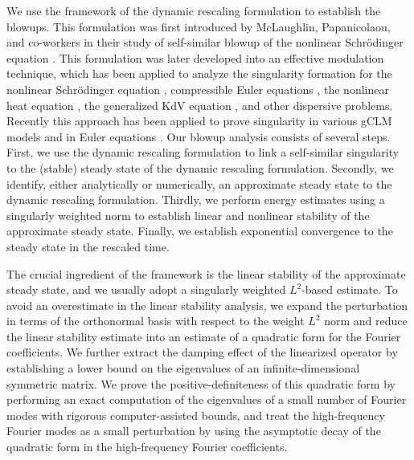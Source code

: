 \documentclass[12pt]{caltech_thesis}
\numberwithin{equation}{section}
\begin{document}
We use the framework of the dynamic rescaling formulation to establish the blowups. This formulation was first introduced by McLaughlin, Papanicolaou, and co-workers in their study of self-similar blowup of the nonlinear Schr\"odinger equation  \cite{mclaughlin1986focusing,landman1988rate}.  This formulation was later developed into an effective modulation technique, which has been applied to analyze the singularity formation for the nonlinear Schr\"odinger equation \cite{kenig2006global,merle2005blow}, compressible Euler equations \cite{buckmaster2019formation},  the nonlinear heat equation \cite{merle1997stability}, the generalized KdV equation \cite{martel2014blow}, and other dispersive problems. Recently this approach has been applied to prove singularity in various gCLM models \cite{chen2021finite,chen2021regularity,chen2021slightly} and in Euler equations \cite{ elgindi2021finite, chen2019finite2, chen2022stable}. Our blowup analysis consists of several steps.  First, we use the dynamic rescaling formulation to link a self-similar singularity to the (stable) steady state of the dynamic rescaling formulation. Secondly, we identify, either analytically or numerically, an approximate steady state to the dynamic rescaling formulation. Thirdly, we perform energy estimates using a singularly weighted norm to establish linear and nonlinear stability of the approximate steady state. Finally, we establish exponential convergence to the steady state in the rescaled time. 

The crucial ingredient of the framework is the linear stability of the approximate steady state, and we usually adopt a singularly weighted $L^2$-based estimate. {To avoid an overestimate in the linear stability analysis, we expand the perturbation in terms of the orthonormal basis with respect to the weight $L^2$ norm and reduce the linear stability estimate into an estimate of a quadratic form for the Fourier coefficients. We further extract the damping effect of the linearized operator by establishing a lower bound on the eigenvalues of an infinite-dimensional symmetric matrix. We prove the positive-definiteness of this quadratic form by performing an exact computation of the eigenvalues of a small number of Fourier modes with rigorous computer-assisted bounds}, and treat the high-frequency Fourier modes as a small perturbation by using the asymptotic decay of {the quadratic form in} the high-frequency Fourier coefficients.
\end{document}
